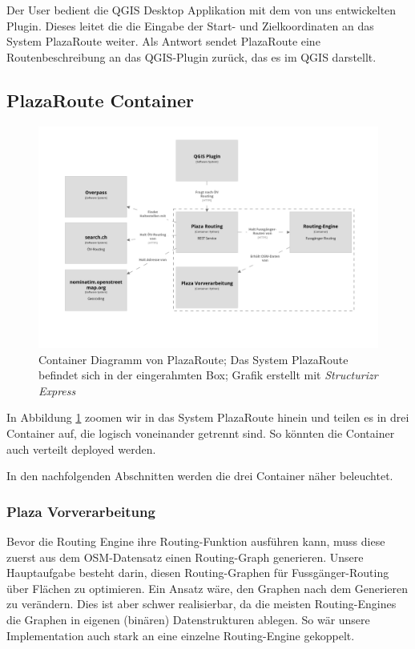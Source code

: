 Der User bedient die QGIS Desktop Applikation mit dem von uns entwickelten Plugin. Dieses leitet die die Eingabe der Start- und Zielkoordinaten an das System PlazaRoute weiter. Als Antwort sendet PlazaRoute eine Routenbeschreibung an das QGIS-Plugin zurück, das es im QGIS darstellt.

\subsection{PlazaRoute Container}
\label{architektur:PlazaRoute Container}

\begin{figure}[ht]
    \centering
    \includegraphics[width=1\linewidth]{projectdoc/img/container_diagram.png}
    \caption[Container Diagramm]{Container Diagramm von PlazaRoute; Das System PlazaRoute befindet sich in der eingerahmten Box; Grafik erstellt mit \emph{Structurizr Express}\cite{structurizr}}
    \label{fig:container_diagram}
\end{figure}

In Abbildung \ref{fig:container_diagram} zoomen wir in das System PlazaRoute hinein und teilen es in drei Container auf, die logisch voneinander getrennt sind. So könnten die Container auch verteilt deployed werden.

In den nachfolgenden Abschnitten werden die drei Container näher beleuchtet.


\subsubsection{Plaza Vorverarbeitung}
\label{architektur:Plaza Vorverarbeitung}

Bevor die Routing Engine ihre Routing-Funktion ausführen kann, muss diese zuerst aus dem \ac{OSM}-Datensatz einen Routing-Graph generieren. Unsere Hauptaufgabe besteht darin, diesen Routing-Graphen für Fussgänger-Routing über Flächen zu optimieren. Ein Ansatz wäre, den Graphen nach dem Generieren zu verändern. Dies ist aber schwer realisierbar, da die meisten Routing-Engines die Graphen in eigenen (binären) Datenstrukturen ablegen. So wär unsere Implementation auch stark an eine einzelne Routing-Engine gekoppelt.

